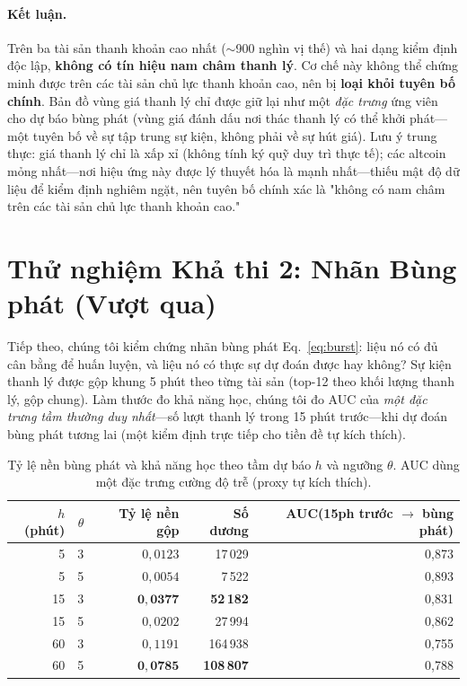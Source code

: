\documentclass[11pt,a4paper]{article}
\begin{document}
\paragraph{Kết luận.} Trên ba tài sản thanh khoản cao nhất ($\sim$900 nghìn vị thế) và hai dạng kiểm định độc lập, \textbf{không có tín hiệu nam châm thanh lý}. Cơ chế này không thể chứng minh được trên các tài sản chủ lực thanh khoản cao, nên bị \textbf{loại khỏi tuyên bố chính}. Bản đồ vùng giá thanh lý chỉ được giữ lại như một \emph{đặc trưng} ứng viên cho dự báo bùng phát (vùng giá đánh dấu nơi thác thanh lý có thể khởi phát---một tuyên bố về sự tập trung sự kiện, không phải về sự hút giá). Lưu ý trung thực: giá thanh lý chỉ là xấp xỉ (không tính ký quỹ duy trì thực tế); các altcoin mỏng nhất---nơi hiệu ứng này được lý thuyết hóa là mạnh nhất---thiếu mật độ dữ liệu để kiểm định nghiêm ngặt, nên tuyên bố chính xác là "không có nam châm trên các tài sản chủ lực thanh khoản cao."

\section{Thử nghiệm Khả thi 2: Nhãn Bùng phát (Vượt qua)}
\label{sec:m0burst}

Tiếp theo, chúng tôi kiểm chứng nhãn bùng phát Eq.~\eqref{eq:burst}: liệu nó có đủ cân bằng để huấn luyện, và liệu nó có thực sự dự đoán được hay không? Sự kiện thanh lý được gộp khung 5 phút theo từng tài sản (top-12 theo khối lượng thanh lý, gộp chung). Làm thước đo khả năng học, chúng tôi đo AUC của \emph{một đặc trưng tầm thường duy nhất}---số lượt thanh lý trong 15 phút trước---khi dự đoán bùng phát tương lai (một kiểm định trực tiếp cho tiền đề tự kích thích).

\begin{table}[ht]
\centering
\caption{Tỷ lệ nền bùng phát và khả năng học theo tầm dự báo $h$ và ngưỡng $\theta$. AUC dùng một đặc trưng cường độ trễ (proxy tự kích thích).}
\label{tab:burstbase}
\begin{tabular}{rrrrr}
\toprule
$h$ (phút) & $\theta$ & Tỷ lệ nền gộp & Số dương & AUC(15ph trước $\to$ bùng phát) \\
\midrule
5  & 3 & $0{,}0123$ & 17\,029  & 0,873 \\
5  & 5 & $0{,}0054$ & 7\,522   & 0,893 \\
15 & 3 & $\mathbf{0{,}0377}$ & \textbf{52\,182}  & 0,831 \\
15 & 5 & $0{,}0202$ & 27\,994  & 0,862 \\
60 & 3 & $0{,}1191$ & 164\,938 & 0,755 \\
60 & 5 & $\mathbf{0{,}0785}$ & \textbf{108\,807} & 0,788 \\
\bottomrule
\end{tabular}
\end{table}
\end{document}
